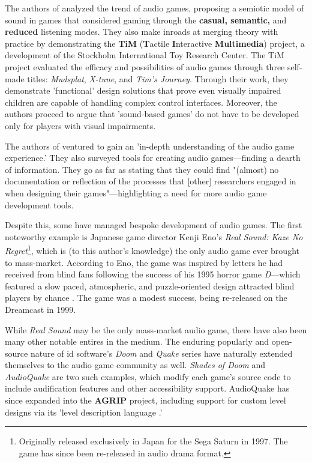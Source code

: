 \documentclass{report}
\newcommand{\tech}[1]{\textbf{#1}}
\begin{document}
The authors of \cite{friberg2004audio} analyzed the trend of audio games, proposing a semiotic model of sound in games that considered gaming through the \tech{casual, semantic,} and \tech{reduced} listening modes. They also make inroads at merging theory with practice by demonstrating the \tech{TiM} (\tech{T}actile \tech{I}nteractive \tech{Multimedia}) project, a development of the Stockholm International Toy Research Center. The TiM project evaluated the efficacy and possibilities of audio games through three self-made titles: \emph{Mudsplat}, \emph{X-tune}, and \emph{Tim's Journey}. Through their work, they demonstrate 'functional' design solutions that prove even visually impaired children are capable of handling complex control interfaces. Moreover, the authors proceed to argue that 'sound-based games' do not have to be developed only for players with visual impairments. 


The authors of \cite{urbanek2019unpacking} ventured to gain an 'in-depth understanding of the audio game experience.' They also surveyed tools for creating audio games---finding a dearth of information. They go as far as stating that they could find "(almost) no documentation or reflection of the processes that [other] researchers engaged in when designing their games"---highlighting a need for more audio game development tools.

Despite this, some have managed bespoke development of audio games. The first noteworthy example is Japanese game director Kenji Eno's \emph{Real Sound: Kaze No Regret}\footnote{Originally released exclusively in Japan for the Sega Saturn in 1997. The game has since been re-released in audio drama format.}, which is (to this author's knowledge) the only audio game ever brought to mass-market. According to Eno, the game was inspired by letters he had received from blind fans following the success of his 1995 horror game \emph{D}---which featured a slow paced, atmospheric, and puzzle-oriented design attracted blind players by chance \cite{Torres_2005}. The game was a modest success, being re-released on the Dreamcast in 1999.

While \emph{Real Sound} may be the only mass-market audio game, there have also been many other notable entires in the medium. The enduring popularly and open-source nature of id software's \emph{Doom} and \emph{Quake} series have naturally extended themselves to the audio game community as well. \emph{Shades of Doom} \cite{GMA_Games} and \emph{AudioQuake} \cite{atkinson2006making} are two such examples, which modify each game's source code to include audification features and other accessibility support. AudioQuake has since expanded into the \tech{AGRIP} project, including support for custom level designs via its 'level description language \cite{Atkinson2009}.'
\end{document}
